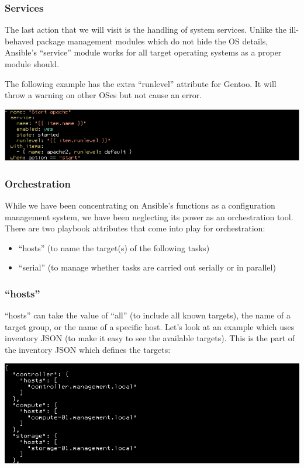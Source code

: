 \documentclass[helvetica,english,utf8,notitle,nologo]{beamer}
\begin{document}
\begin{frame}
  \frametitle{Services}

  The last action that we will visit is the handling of system
  services. Unlike the ill-behaved package management modules which do
  not hide the OS details, Ansible's ``service'' module works for all
  target operating systems as a proper module should.

  The following example has the extra ``runlevel'' attribute for
  Gentoo. It will throw a warning on other OSes but not cause an
  error.

  \includegraphics[scale=0.34]{img_25}
\end{frame}

\begin{frame}
  \frametitle{Orchestration}

  While we have been concentrating on Ansible's functions as a
  configuration management system, we have been neglecting its power
  as an orchestration tool. There are two playbook attributes that
  come into play for orchestration:

  \begin{itemize}
  \item ``hosts'' (to name the target(s) of the following tasks)
  \item ``serial'' (to manage whether tasks are carried out serially
    or in parallel)
  \end{itemize}
\end{frame}

\begin{frame}
  \frametitle{``hosts''}

  ``hosts'' can take the value of ``all'' (to include all known
  targets), the name of a target group, or the name of a specific
  host. Let's look at an example which uses inventory JSON (to make
  it easy to see the available targets). This is the part of the
  inventory JSON which defines the targets:

  \includegraphics[scale=0.44]{img_28}
\end{frame}
\end{document}
